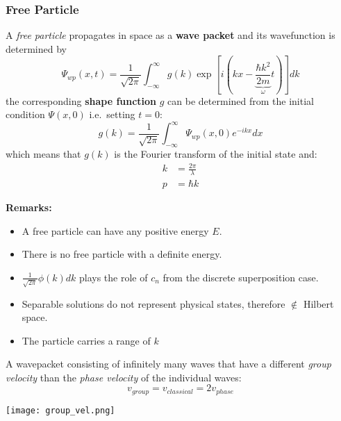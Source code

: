 \subsubsection{Free Particle}
A \textit{free particle} propagates in space as a \textbf{wave packet} and its wavefunction is determined by
\noindent\begin{equation*}
    \Psi_{wp}(x,t)=\frac{1}{\sqrt{2\pi}}\int_{-\infty}^{\infty}g(k)\exp\left[i\left(kx- \underbrace{\frac{\hbar k^{2}}{2m}}_{\omega}t\right)\right]dk
\end{equation*}
the corresponding \textbf{shape function} $g$ can be determined from the initial condition $\Psi(x,0)$ i.e.\ setting $t=0$:
\noindent\begin{equation*}
    g(k)=\frac{1}{\sqrt{2\pi}}\int_{-\infty}^{\infty}\Psi_{wp}(x,0)e^{-ikx}dx
\end{equation*}
which means that $g(k)$ is the Fourier transform of the initial state and:
\begin{align*}
    k & = \frac{2\pi}{\lambda} \\
    p & = \hbar k
\end{align*}

\textbf{Remarks:}

\begin{itemize}
    \item A free particle can have any positive energy $E$.
    \item There is no free particle with a definite energy.
    \item $\frac{1}{\sqrt{2\pi}}\phi(k)dk$ plays the role of $c_n$ from the discrete superposition case.
    \item Separable solutions do not represent physical states, therefore $\notin$ Hilbert space.
    \item The particle carries a range of $k$
\end{itemize}


A wavepacket consisting of infinitely many waves that have a different \textit{group velocity} than the \textit{phase velocity} of the individual waves:
\noindent\begin{equation*}
    v_{group} = v_{classical} = 2v_{phase}
\end{equation*}

\begin{center}
    \texttt{[image: group\_vel.png]}
\end{center}


